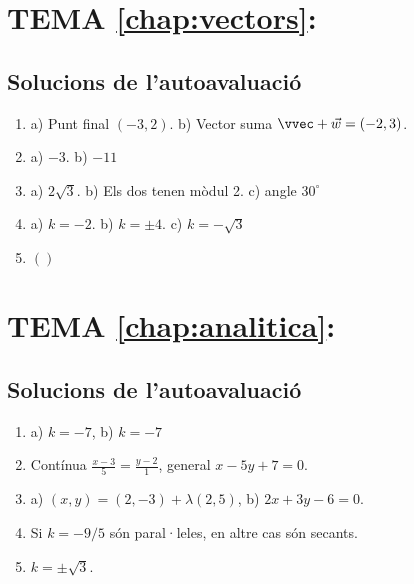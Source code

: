 

\section*{TEMA \ref{chap:vectors}: }

\subsection*{Solucions de l'autoavaluació}
\begin{enumerate}
	\item a) Punt final $(-3,2)$. b) Vector suma $\vvec+\vec w=(-2,3)$.
	\item a) $-3$.  b) $-11$
	\item a) $2\sqrt{3}$. b) Els dos tenen mòdul 2. c) angle $30^\circ$
	\item a) $k=-2$. b) $k=\pm 4$. c) $k=-\sqrt{3}$
	\item $()$
\end{enumerate}







\section*{TEMA \ref{chap:analitica}: }

\subsection*{Solucions de l'autoavaluació}
\begin{enumerate}
	\item a) $k=-7$, b) $k=-7$
	\item Contínua $\frac{x-3}{5}=\frac{y-2}{1}$, general $x-5y+7=0$.
	\item a) $(x,y)=(2,-3)+\lambda(2, 5)$,  b) $2x+3y-6=0$.
	\item Si $k=-9/5$ són paral·leles, en altre cas són secants.
	\item $k=\pm \sqrt{3}$.
\end{enumerate}




